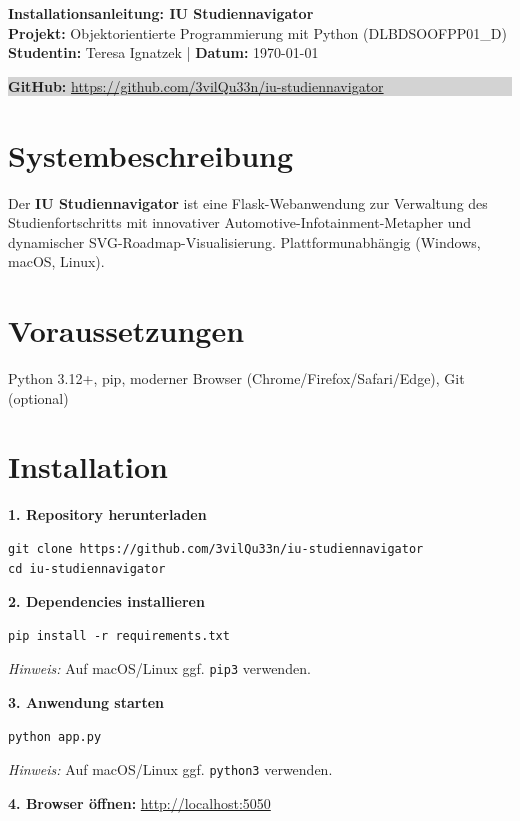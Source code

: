 \documentclass[11pt,a4paper]{article}
\begin{document}
\noindent
\textbf{\large Installationsanleitung: IU Studiennavigator}\\[0.2cm]
\textbf{Projekt:} Objektorientierte Programmierung mit Python (DLBDSOOFPP01\_D)\\
\textbf{Studentin:} Teresa Ignatzek | \textbf{Datum:} \today

\vspace{0.3cm}

\noindent
\colorbox{lightgray}{\parbox{\textwidth}{
\textbf{GitHub:} \url{https://github.com/3vilQu33n/iu-studiennavigator}
}}

\vspace{0.3cm}

\section*{Systembeschreibung}
Der \textbf{IU Studiennavigator} ist eine Flask-Webanwendung zur Verwaltung des Studienfortschritts mit innovativer Automotive-Infotainment-Metapher und dynamischer SVG-Roadmap-Visualisierung. Plattformunabhängig (Windows, macOS, Linux).

\section*{Voraussetzungen}
Python 3.12+, pip, moderner Browser (Chrome/Firefox/Safari/Edge), Git (optional)

\section*{Installation}

\noindent\textbf{1. Repository herunterladen}
\begin{verbatim}
git clone https://github.com/3vilQu33n/iu-studiennavigator
cd iu-studiennavigator
\end{verbatim}

\noindent\textbf{2. Dependencies installieren}
\begin{verbatim}
pip install -r requirements.txt
\end{verbatim}
\textit{Hinweis:} Auf macOS/Linux ggf. \texttt{pip3} verwenden.

\noindent\textbf{3. Anwendung starten}
\begin{verbatim}
python app.py
\end{verbatim}
\textit{Hinweis:} Auf macOS/Linux ggf. \texttt{python3} verwenden.

\noindent\textbf{4. Browser öffnen:} \url{http://localhost:5050}
\end{document}
